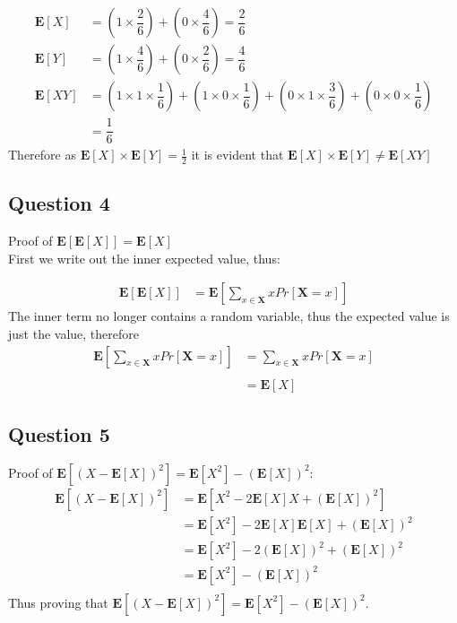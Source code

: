 \documentclass{article}
\begin{document}
\begin{align*}
\mathbf{E}[X] &= \left(1 \times \dfrac{2}{6} \right) + \left(0 \times \dfrac{4}{6}\right) = \dfrac{2}{6} \\
\mathbf{E}[Y] &= \left(1 \times \dfrac{4}{6}\right) + \left(0 \times \dfrac{2}{6}\right) = \dfrac{4}{6} \\
\mathbf{E}[XY] &= \left(1 \times 1 \times \dfrac{1}{6}\right) + \left(1 \times 0 \times \dfrac{1}{6}\right) + \left(0 \times 1  \times \dfrac{3}{6}\right) + \left(0 \times 0 \times \dfrac{1}{6}\right) \\
&= \dfrac{1}{6}
\end{align*}
Therefore as $\mathbf{E}[X] \times \mathbf{E}[Y] = \frac{1}{2} $ it is evident that $\mathbf{E}[X] \times \mathbf{E}[Y] \neq \mathbf{E}[XY]$




\subsection{Question 4}
Proof of $ \mathbf{E}[\mathbf{E}[X]] = \mathbf{E}[X] $ \\
First we write out the inner expected value, thus:

\begin{align*}
\mathbf{E}[\mathbf{E}[X]] &= \mathbf{E} \left[ \sum\limits_{x \in \mathbf{X}} x Pr[\mathbf{X} = x] \right]
\end{align*}
The inner term no longer contains a random variable, thus the expected value is just the value, therefore
\begin{align*}
\mathbf{E} \left[ \sum\limits_{x \in \mathbf{X}} x Pr[\mathbf{X} = x] \right] &= \sum\limits_{x \in \mathbf{X}} x Pr[\mathbf{X} = x] \\ \\
&=  \mathbf{E}[X]
\end{align*}



\subsection{Question 5}
Proof of $\mathbf{E}\left[(X-\mathbf{E}[X])^2 \right] = 
\mathbf{E}[X^2]-\left( \mathbf{E}[X] \right) ^2:
$
\begin{align*}
\mathbf{E}\left[(X-\mathbf{E}[X])^2 \right] &=
\mathbf{E}\left[X^2-2\mathbf{E}[X]X+  \left(\mathbf{E}[X]\right)^2 \right]\\
&=
\mathbf{E}[X^2]-2\mathbf{E}[X]\mathbf{E}[X]+\left(\mathbf{E}[X]\right)^2 \\
&=
\mathbf{E}[X^2]-2 \left(\mathbf{E}[X]\right)^2 +\left(\mathbf{E}[X]\right)^2 \\
&=
\mathbf{E}[X^2]-\left(\mathbf{E}[X]\right)^2\\
\end{align*}
Thus proving that $\mathbf{E}\left[(X-\mathbf{E}[X])^2 \right] = 
\mathbf{E}[X^2]-\left( \mathbf{E}[X] \right) ^2$.
\end{document}

